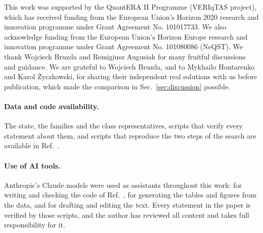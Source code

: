 \documentclass[aps,pra,reprint,superscriptaddress,amsmath,amssymb,longbibliography]{revtex4-2}
\theoremstyle{plain}
\begin{document}
\begin{acknowledgments}
This work was supported by the QuantERA II Programme (VERIqTAS project), which has received funding from the European Union’s Horizon 2020 research and innovation programme under Grant Agreement No. 101017733. We also acknowledge funding from the European Union’s Horizon Europe research and innovation programme under Grant Agreement No. 101080086 (NeQST). We thank Wojciech Bruzda and Remigiusz Augusiak for many fruitful discussions and guidance.  We are grateful to
Wojciech Bruzda, and to Mykhailo Hontarenko and Karol \.Zyczkowski, for sharing their independent real solutions with
us before publication, which made the comparison in Sec.~\ref{sec:discussion} possible.
\end{acknowledgments}

\paragraph*{Data and code availability.}  The state, the families and the class representatives, scripts that verify
every statement about them, and scripts that reproduce the two steps of the search are available in
Ref.~\cite{repo}.

\paragraph*{Use of AI tools.}  Anthropic's Claude models were used as assistants throughout this
work: for writing and checking the code of Ref.~\cite{repo}, for generating the tables and figures from the data, and for drafting and editing the text.  Every statement in the paper is verified by those scripts, and the author has reviewed all content and takes full responsibility for it.

\twocolumngrid

\end{document}

